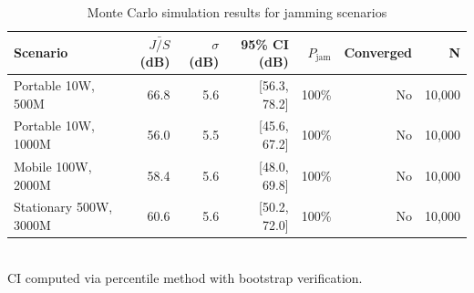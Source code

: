 \begin{table}[htbp]
\centering
\caption{Monte Carlo simulation results for jamming scenarios}
\label{tab:mc_results}
\begin{tabular}{lrrrrrr}
\toprule
Scenario & $\bar{J/S}$ (dB) & $\sigma$ (dB) & 95\% CI (dB) & $P_{\text{jam}}$ & Converged & N \\
\midrule
Portable 10W, 500M & 66.8 & 5.6 & [56.3, 78.2] & 100\% & No & 10,000 \\
Portable 10W, 1000M & 56.0 & 5.5 & [45.6, 67.2] & 100\% & No & 10,000 \\
Mobile 100W, 2000M & 58.4 & 5.6 & [48.0, 69.8] & 100\% & No & 10,000 \\
Stationary 500W, 3000M & 60.6 & 5.6 & [50.2, 72.0] & 100\% & No & 10,000 \\
\bottomrule
\end{tabular}
\\[2pt]
\footnotesize{CI computed via percentile method with bootstrap verification.}
\end{table}
